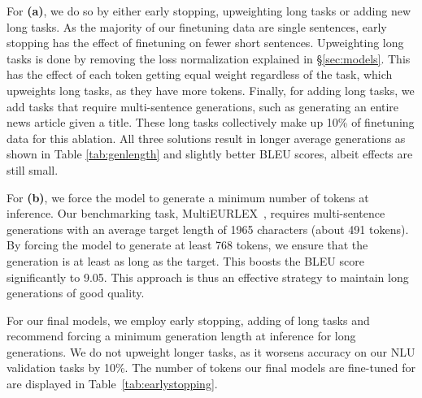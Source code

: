 \documentclass[11pt]{article}
\begin{document}
For \textbf{(a)}, we do so by either early stopping, upweighting long tasks or adding new long tasks. As the majority of our finetuning data are single sentences, early stopping has the effect of finetuning on fewer short sentences. Upweighting long tasks is done by removing the loss normalization explained in \S\ref{sec:models}. This has the effect of each token getting equal weight regardless of the task, which upweights long tasks, as they have more tokens. Finally, for adding long tasks, we add tasks that require multi-sentence generations, such as generating an entire news article given a title. These long tasks collectively make up 10\% of finetuning data for this ablation. All three solutions result in longer average generations as shown in Table \ref{tab:genlength} and slightly better BLEU scores, albeit effects are still small.

For \textbf{(b)}, we force the model to generate a minimum number of tokens at inference. Our benchmarking task, MultiEURLEX~\cite{chalkidis2021multieurlex}, requires multi-sentence generations with an average target length of 1965 characters (about 491 tokens). By forcing the model to generate at least 768 tokens, we ensure that the generation is at least as long as the target. This boosts the BLEU score significantly to 9.05. This approach is thus an effective strategy to maintain long generations of good quality.

For our final models, we employ early stopping, adding of long tasks and recommend forcing a minimum generation length at inference for long generations. We do not upweight longer tasks, as it worsens accuracy on our NLU validation tasks by 10\%. The number of tokens our final models are fine-tuned for are displayed in Table~\ref{tab:earlystopping}.

\begin{table}[h]
    \small
    \begin{center}
    \caption{7.1 billion parameter BLOOMZ models with various modifications benchmarked on MultiEURLEX English-French translation~\cite{chalkidis2021multieurlex}. We benchmark three prompts on both English to French and French to English translation. We then take the median performance across the three prompts for each translation direction and average the two scores to arrive at the BLEU score reported.}
    \label{tab:genlength}
    \end{center}
\end{table}
\end{document}
